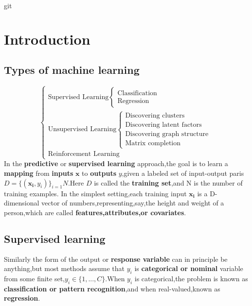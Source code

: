 git\chapter{Introduction}
\label{chapter:Introduction}

\section{Types of machine learning}
\begin{equation}\nonumber
\begin{cases}
\text{Supervised Learning} \begin{cases} \text{Classification} \\ \text{Regression} \end{cases}\\
\text{Unsupervised Learning} \begin{cases} \text{Discovering clusters} \\ \text{Discovering latent factors} \\ \text{Discovering graph structure} \\ \text{Matrix completion} \end{cases}\\
\text{Reinforcement Learning}
\end{cases}
\end{equation}
In the \textbf{predictive} or \textbf{supervised learning} approach,the goal is to learn a \textbf{mapping} from \textbf{inputs} $\mathbf{x}$ to \textbf{outputs} $y$,given a labeled set of input-output paris $D=\{(\mathbf{x_i},y_i)\}_{i=1}{N}$.Here $D$ is called the \textbf{training set},and N is the number of training examples.
In the simplest setting,each training input $\mathbf{x_i}$ is a D-dimensional vector of numbers,representing,say,the height and weight of a person,which are called \textbf{features,attributes,or covariates}.

\section{Supervised learning}
  Similarly the form of the output or \textbf{response variable} can in principle be anything,but most methods assume that $y_i$ is \textbf{categorical or nominal} variable from some finite set,$y_i \in \{1,...,C\}$.When $y_i$ is categorical,the problem is known as \textbf{classification or pattern recognition},and when real-valued,known as \textbf{regression}.
